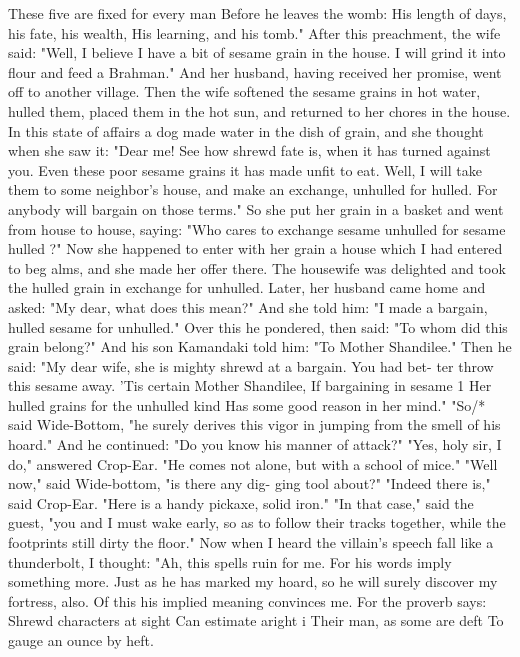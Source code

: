 \documentclass{book}
\begin{document}
These five are fixed for every man
Before he leaves the womb:
His length of days, his fate, his wealth,
His learning, and his tomb."
After this preachment, the wife said: "Well, I
believe I have a bit of sesame grain in the house. I
will grind it into flour and feed a Brahman." And her
husband, having received her promise, went off to
another village.
Then the wife softened the sesame grains in hot
water, hulled them, placed them in the hot sun, and
returned to her chores in the house. In this state of
affairs a dog made water in the dish of grain, and she
thought when she saw it: "Dear me! See how shrewd
fate is, when it has turned against you. Even these
poor sesame grains it has made unfit to eat. Well, I
will take them to some neighbor's house, and make
an exchange, unhulled for hulled. For anybody will
bargain on those terms." So she put her grain in a
basket and went from house to house, saying: "Who
cares to exchange sesame unhulled for sesame hulled ?"
Now she happened to enter with her grain a house
which I had entered to beg alms, and she made her
offer there. The housewife was delighted and took
the hulled grain in exchange for unhulled. Later, her
husband came home and asked: "My dear, what does
this mean?" And she told him: "I made a bargain,
hulled sesame for unhulled."
Over this he pondered, then said: "To whom did
this grain belong?" And his son Kamandaki told him:
"To Mother Shandilee." Then he said: "My dear
wife, she is mighty shrewd at a bargain. You had bet-
ter throw this sesame away.
'Tis certain Mother Shandilee,
If bargaining in sesame
1            Her hulled grains for the unhulled kind
Has some good reason in her mind."
"So/* said Wide-Bottom, "he surely derives this
vigor in jumping from the smell of his hoard." And
he continued: "Do you know his manner of attack?"
"Yes, holy sir, I do," answered Crop-Ear. "He comes
not alone, but with a school of mice."
"Well now," said Wide-bottom, "is there any dig-
ging tool about?" "Indeed there is," said Crop-Ear.
"Here is a handy pickaxe, solid iron." "In that case,"
said the guest, "you and I must wake early, so as to
follow their tracks together, while the footprints still
dirty the floor."
Now when I heard the villain's speech fall like a
thunderbolt, I thought: "Ah, this spells ruin for me.
For his words imply something more. Just as he has
marked my hoard, so he will surely discover my
fortress, also. Of this his implied meaning convinces
me. For the proverb says:
Shrewd characters at sight
Can estimate aright                                          i
Their man, as some are deft
To gauge an ounce by heft.
\end{document}
